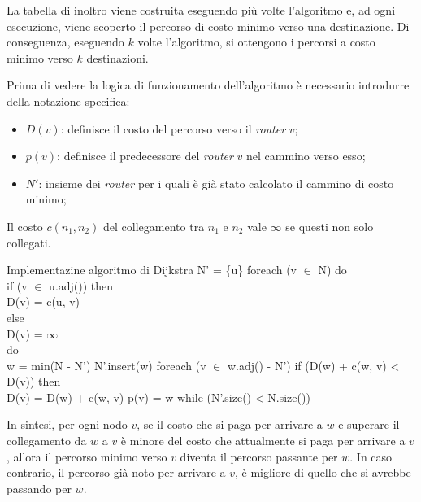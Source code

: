 La tabella di inoltro viene costruita eseguendo più volte l'algoritmo e, ad ogni
esecuzione, viene scoperto il percorso di costo minimo verso una destinazione.
Di conseguenza, eseguendo $k$ volte l'algoritmo, si ottengono i percorsi a costo
minimo verso $k$ destinazioni.

Prima di vedere la logica di funzionamento dell'algoritmo è necessario introdurre
della notazione specifica:
\begin{itemize}
    \item $D(v)$: definisce il costo del percorso verso il \emph{router} $v$;
    \item $p(v)$: definisce il predecessore del \emph{router} $v$ nel cammino
    verso esso;
    \item $N'$: insieme dei \emph{router} per i quali è già stato calcolato il
    cammino di costo minimo;
\end{itemize}
\begin{note}
    Il costo $c(n_1,n_2)$ del collegamento tra $n_1$ e $n_2$ vale $\infty$ se
    questi non solo collegati.
\end{note}

\begin{minicode}{Implementazine algoritmo di Dijkstra}
\rmbreak N' = \{u\}\hfill{}
foreach (v $\in$ N) do\\
    \indf if (v $\in$ u.adj()) then\\
        D(v) = c(u, v)\\
    \indf else\\
        D(v) = $\infty$\\
\rmbreak{}
do\\
    \indf{} w = min(N - N')\hfill{}
    \indf N'.insert(w)\hfill{}
    \indf foreach (v $\in$ w.adj() - N')\hfill{}
        \indff if (D(w) + c(w, v) < D(v)) then\\
            D(v) = D(w) + c(w, v)\hfill{}
            p(v) = w\hfill{}
\rmbreak while (N'.size() < N.size())\hfill{}
\end{minicode}\noindent
In sintesi, per ogni nodo $v$, se il costo che si paga per arrivare a $w$ e
superare il collegamento da $w$ a $v$ è minore del costo che attualmente si paga
per arrivare a $v$, allora il percorso minimo verso $v$ diventa il percorso passante
per $w$. In caso contrario, il percorso già noto per arrivare a $v$, è migliore
di quello che si avrebbe passando per $w$.

